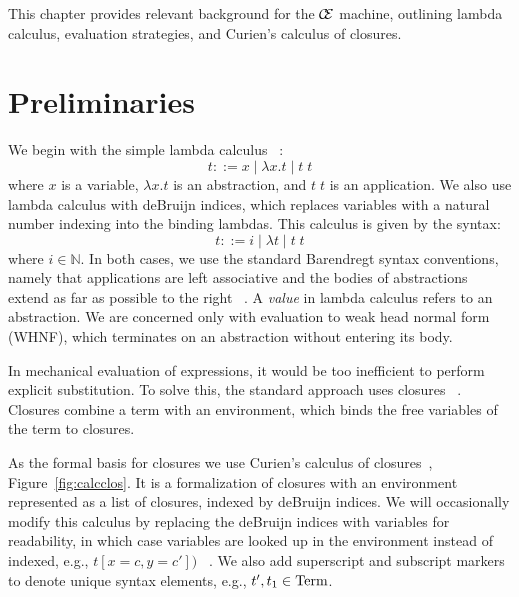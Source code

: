 This chapter provides relevant background for the $\mathcal{\mathcal{C} \mskip
-4mu \mathcal{E}}$ machine, outlining lambda calculus, evaluation strategies,
and Curien's calculus of closures.

\section{Preliminaries} \label{sec:prelim}

We begin with the simple lambda calculus ~\cite{barendregt1984lambda}:  $$ t::= x
\; | \;  \lambda x.t \; | \;  t \; t $$ where $x$ is a variable, $\lambda x.t$
is an abstraction, and $t \; t$ is an application. We also use lambda calculus
with deBruijn indices, which replaces variables with a natural number indexing
into the binding lambdas.  This calculus is given by the syntax: $$ t::= i \; |
\; \lambda t \; | \; t \; t $$ where $i \in \mathbb{N}$. In both cases, we use
the standard Barendregt syntax conventions, namely that applications are left
associative and the bodies of abstractions extend as far as possible to the
right ~\cite{barendregt1984lambda}.  A \emph{value} in lambda calculus refers to
an abstraction. We are concerned only with evaluation to weak head normal form
(WHNF), which terminates on an abstraction without entering its body.

In mechanical evaluation of expressions, it would be too inefficient to perform
explicit substitution. To solve this, the standard approach uses closures
~\cite{landin1964mechanical,curien1991abstract,jonesstg,biernacka2007concrete}.
Closures combine a term with an environment, which binds the free variables of
the term to closures. 

As the formal basis for closures we use Curien's calculus of
closures~\cite{curien1991abstract}, Figure~\ref{fig:calcclos}.  It is a
formalization of closures with an environment represented as a list of closures,
indexed by deBruijn indices. We will occasionally modify this calculus by
replacing the deBruijn indices with variables for readability, in which case
variables are looked up in the environment instead of indexed, e.g., $t[x = c, y
= c'])$ ~\cite{barendregt1984lambda}. We also add superscript and subscript
markers to denote unique syntax elements, e.g., $t', t_1 \in \textnormal{Term}$. 

